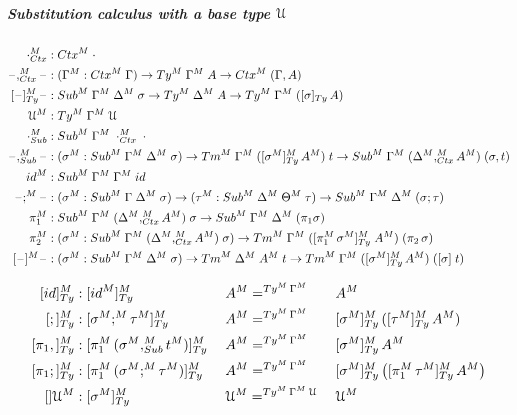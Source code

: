 \documentclass[a4paper,UKenglish,numberwithinsect,cleveref,thm-restate]{lipics-v2021}
\begin{document}
\subparagraph*{Substitution calculus with a base type $\mathcal{U}$}
\begin{alignat*}{10}
  \emptyctx_{\Ctx}^M     & : \Ctx^M\;\emptyctx \\
  \blank,_{\Ctx}^M\blank & : (\Gamma^M : \Ctx^M\;\Gamma) \to \Ty^M\;\Gamma^M\;A \to \Ctx^M\;(\Gamma, A) \\
  [\blank]_{\Ty}^M\blank & : \Sub^M\;\Gamma^M\;\Delta^M\;\sigma \to \Ty^M\;\Delta^M\;A \to \Ty^M\;\Gamma^M\;([\sigma]_{\Ty}\,A) \\
  \UU^M                  & : \Ty^M\;\Gamma^M\;\UU \\
  \emptysub_{\Sub}^M     & : \Sub^M\;\Gamma^M\;\emptyctx_{\Ctx}^M\;\cdot \\
  \blank,_{\Sub}^M\blank & : (\sigma^M : \Sub^M\;\Gamma^M\;\Delta^M\;\sigma) \to \Tm^M\;\Gamma^M\;([\sigma^M]^M_{\Ty}\,A^M)\;t \to \Sub^M\;\Gamma^M\;(\Delta^M ,^M_{\Ctx} A^M)\;(\sigma, t) \\
  \idS^M                 & : \Sub^M\;\Gamma^M\;\Gamma^M\;\idS \\
  \blank;^M\blank        & : (\sigma^M : \Sub^M\;\Gamma\;\Delta^M\;\sigma) \to (\tau^M : \Sub^M\;\Delta^M\;\Theta^M\;\tau) \to \Sub^M\;\Gamma^M\;\Delta^M\;(\sigma ; \tau) \\
  \pi_1^M                & : \Sub^M\;\Gamma^M\;(\Delta^M ,_{\Ctx}^M A^M)\;\sigma \to \Sub^M\;\Gamma^M\;\Delta^M\;(\pi_1\sigma) \\
  \pi_2^M                & : (\sigma^M : \Sub^M\;\Gamma^M\;(\Delta^M ,_{\Ctx}^M A^M)\;\sigma) \to \Tm^M\;\Gamma^M\;([ \pi_1^M\,\sigma^M ]^M_{\Ty}\;A^M)\;(\pi_2\,\sigma) \\
  [\blank]^M\blank       & : (\sigma^M : \Sub^M\;\Gamma^M\;\Delta^M\;\sigma) \to \Tm^M\;\Delta^M\;A^M\;t \to \Tm^M\;\Gamma^M\;([\sigma^M]_{\Ty}^M\,A^M)\;([\sigma]\;t)
\end{alignat*}

\begin{alignat*}{5}
  [\idS]_{\Ty}^M      & : [ \idS^M ]^M_{\Ty}                             && \;A^M =^{\Ty^M\,\Gamma^M}\; && A^M \\
  [;]_{\Ty}^M         & : [ \sigma^M ;^M \tau^M ]^M_{\Ty}                && \;A^M =^{\Ty^M\,\Gamma^M}\; && [\sigma^M]^M_{\Ty}\,([\tau^M]^M_{\Ty}\,A^M) \\
  [\pi_1,]^M_{\Ty}    & : [ \pi_1^M\,(\sigma^M ,^M_{\Sub} t^M) ]^M_{\Ty} && \;A^M =^{\Ty^M\,\Gamma^M} \; && [\sigma^M]^M_{\Ty}\,A^M \\
  [\pi_1;]^M_{\Ty}    & : [ \pi_1^M\,(\sigma^M ;^M \tau^M) ]^M_{\Ty}     && \;A^M =^{\Ty^M\,\Gamma^M} \; && [\sigma^M]^M_{\Ty}\left([ \pi_1^M\,\tau^M]^M_{\Ty}\,A^M\right) \\
  []\UU^M             & : [ \sigma^M ]^M_{\Ty}                           && \;\UU^M =^{\Ty^M\,\Gamma^M\,\UU}      {} && \UU^M
\end{alignat*}
\end{document}
